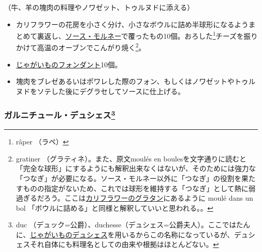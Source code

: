 \begin{recette}


（牛、羊の塊肉の料理やノワゼット、トゥルヌドに添える）

\begin{itemize}
\item
  カリフラワーの花房を小さく分け、小さなボウルに詰め半球形になるようまとめて裏返し、\protect\hyperlink{sauce-mornay}{ソース・モルネー}で覆ったもの10個。おろした\footnote{râper
    （ラペ）}チーズを振りかけて高温のオーブンでこんがり焼く\footnote{gratiner
    （グラティネ）。また、原文moulés en
    boulesを文字通りに読むと「完全な球形」にするようにも解釈出来なくはないが、そのためには強力な「つなぎ」が必要になる。ソース・モルネー以外に「つなぎ」の役割を果たすものの指定がないため、これでは球形を維持する「つなぎ」として熱に弱過ぎるだろう。ここは\protect\hyperlink{chou-fleur-au-gratin}{カリフラワーのグラタン}にあるように
    moulé dans un bol
    「ボウルに詰める」と同様と解釈していいと思われる。。}。
\item
  \protect\hyperlink{pommes-de-terre-fondantes}{じゃがいものフォンダント}10個。
\item
  塊肉をブレゼあるいはポワレした際のフォン、もしくはノワゼットやトゥルヌドをソテした後にデグラセしてソースに仕上げる。
\end{itemize}

\hypertarget{garniture-a-la-duchesse}{%
\subsubsection[ガルニチュール・デュシェス]{\texorpdfstring{ガルニチュール・デュシェス\footnote{duc
  （デュック=公爵）、duchesse（デュシェス=公爵夫人）。ここではたんに、\protect\hyperlink{pommes-de-terre-duchesse}{じゃがいものデュシェス}を用いるからこの名称になっているが、デュシェスそれ自体にも料理名としての由来や根拠はほとんどない。}}{ガルニチュール・デュシェス}}\label{garniture-a-la-duchesse}}




\end{recette}
